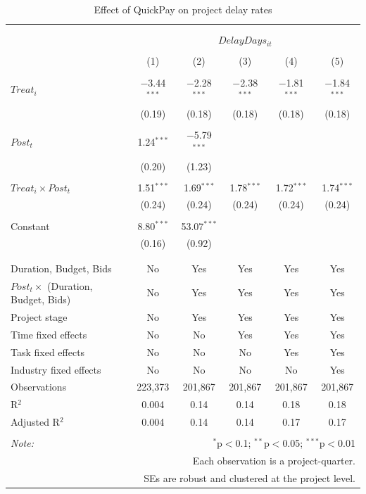 \documentclass[
]{article}
\begin{document}
\begin{table}[H] \centering 
  \caption{Effect of QuickPay on project delay rates} 
  \label{} 
\small 
\begin{tabular}{@{\extracolsep{-2pt}}lccccc} 
\\[-1.8ex]\hline 
\hline \\[-1.8ex] 
\\[-1.8ex] & \multicolumn{5}{c}{$DelayDays_{it}$} \\ 
\\[-1.8ex] & (1) & (2) & (3) & (4) & (5)\\ 
\hline \\[-1.8ex] 
 $Treat_i$ & $-$3.44$^{***}$ & $-$2.28$^{***}$ & $-$2.38$^{***}$ & $-$1.81$^{***}$ & $-$1.84$^{***}$ \\ 
  & (0.19) & (0.18) & (0.18) & (0.18) & (0.18) \\ 
  & & & & & \\ 
 $Post_t$ & 1.24$^{***}$ & $-$5.79$^{***}$ &  &  &  \\ 
  & (0.20) & (1.23) &  &  &  \\ 
  & & & & & \\ 
 $Treat_i \times Post_t$ & 1.51$^{***}$ & 1.69$^{***}$ & 1.78$^{***}$ & 1.72$^{***}$ & 1.74$^{***}$ \\ 
  & (0.24) & (0.24) & (0.24) & (0.24) & (0.24) \\ 
  & & & & & \\ 
 Constant & 8.80$^{***}$ & 53.07$^{***}$ &  &  &  \\ 
  & (0.16) & (0.92) &  &  &  \\ 
  & & & & & \\ 
\hline \\[-1.8ex] 
Duration, Budget, Bids & No & Yes & Yes & Yes & Yes \\ 
$Post_t \times$  (Duration, Budget, Bids) & No & Yes & Yes & Yes & Yes \\ 
Project stage & No & Yes & Yes & Yes & Yes \\ 
Time fixed effects & No & No & Yes & Yes & Yes \\ 
Task fixed effects & No & No & No & Yes & Yes \\ 
Industry fixed effects & No & No & No & No & Yes \\ 
Observations & 223,373 & 201,867 & 201,867 & 201,867 & 201,867 \\ 
R$^{2}$ & 0.004 & 0.14 & 0.14 & 0.18 & 0.18 \\ 
Adjusted R$^{2}$ & 0.004 & 0.14 & 0.14 & 0.17 & 0.17 \\ 
\hline 
\hline \\[-1.8ex] 
\textit{Note:}  & \multicolumn{5}{r}{$^{*}$p$<$0.1; $^{**}$p$<$0.05; $^{***}$p$<$0.01} \\ 
 & \multicolumn{5}{r}{Each observation is a project-quarter.} \\ 
 & \multicolumn{5}{r}{SEs are robust and clustered at the project level.} \\ 
\end{tabular} 
\end{table}
\end{document}

